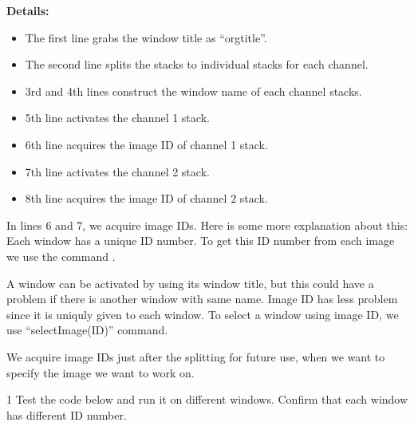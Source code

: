 \textbf{Details:}

\begin{itemize}
\item The first line grabs the window title as ``orgtitle''. 
\item The second line splits the stacks to individual stacks for each channel.
\item 3rd and 4th lines construct the window name of each channel stacks. 
\item 5th line activates the channel 1 stack. 
\item 6th line acquires the image ID of channel 1 stack. 
\item 7th line activates the channel 2 stack. 
\item 8th line acquires the image ID of channel 2 stack. 

\end{itemize}

In lines 6 and 7, we acquire image IDs. Here is some more explanation about this: Each window has a unique ID number. To get this ID number from each image we use the command .

\begin{indentCom}

\end{indentCom}

A window can be activated by  using its window title, but this could have a problem if there is another window with same name. Image ID has less problem since it is uniquly given to each window. To select a window using image ID, we use ``selectImage(ID)'' command.

\begin{indentCom}

\end{indentCom}

We acquire image IDs just after the splitting for future use, when we want to specify the image we want to work on.

\begin{indentexercise}
{1}
Test the code below and run it on different windows. Confirm that each window has different ID number.
\end{indentexercise}

